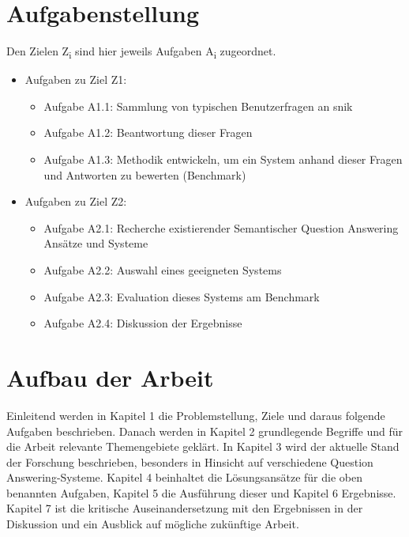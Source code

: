 \section{Aufgabenstellung}

Den Zielen Z\textsubscript{i} sind hier jeweils Aufgaben A\textsubscript{i} zugeordnet.

\begin{itemize}

	\item Aufgaben zu Ziel Z1:
	\begin{itemize}
		\item Aufgabe A1.1: Sammlung von typischen Benutzerfragen an \acs{snik}
		\item Aufgabe A1.2: Beantwortung dieser Fragen
		\item Aufgabe A1.3: Methodik entwickeln, um ein System anhand dieser Fragen und Antworten zu bewerten (Benchmark)
	\end{itemize}
	\item Aufgaben zu Ziel Z2:
	\begin{itemize}
		\item Aufgabe A2.1: Recherche existierender Semantischer Question Answering Ansätze und Systeme
		\item Aufgabe A2.2: Auswahl eines geeigneten Systems
		\item Aufgabe A2.3: Evaluation dieses Systems am Benchmark
		\item Aufgabe A2.4: Diskussion der Ergebnisse
	\end{itemize}
\end{itemize}

\section{Aufbau der Arbeit}

Einleitend werden in Kapitel 1 die Problemstellung, Ziele und daraus folgende Aufgaben beschrieben.
Danach werden in Kapitel 2 grundlegende Begriffe und für die Arbeit relevante Themengebiete geklärt.
In Kapitel 3 wird der aktuelle Stand der Forschung beschrieben, besonders in Hinsicht auf verschiedene Question Answering-Systeme.
Kapitel 4 beinhaltet die Lösungsansätze für die oben benannten Aufgaben, Kapitel 5 die Ausführung dieser und Kapitel 6 Ergebnisse.
Kapitel 7 ist die kritische Auseinandersetzung mit den Ergebnissen in der Diskussion und ein Ausblick auf mögliche zukünftige Arbeit.
